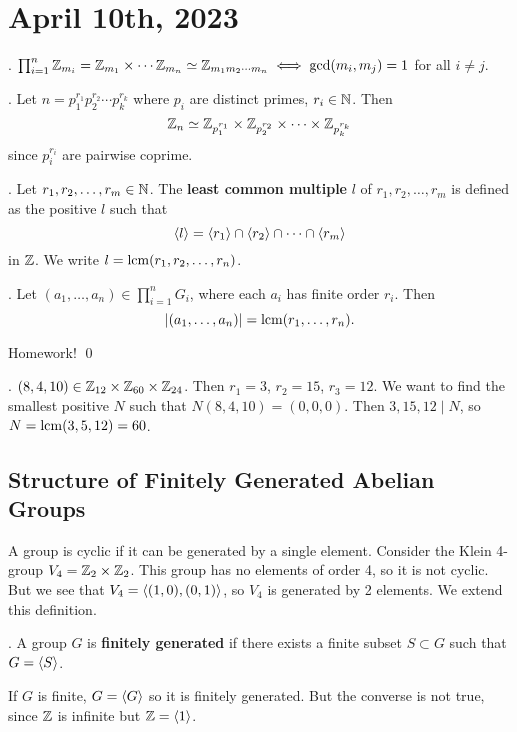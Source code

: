 \section*{April 10th, 2023}

\cor. \(\prod_{i=1}^n \mathbb{Z}_{m_i} = \mathbb{Z}_{m_1} \times \cdots \mathbb{Z}_{m_n} \simeq \mathbb{Z}_{m_1 m_2 \cdots m_n} \iff \gcd(m_i, m_j) = 1\) for all \(i \neq j\).

\ex. Let \(n = p_1^{r_1}p_2^{r_2} \cdots p_k^{r_k}\) where \(p_i\) are distinct primes, \(r_i \in \mathbb{N}\). Then
\[
    \mathbb{Z}_n \simeq \mathbb{Z}_{p_1^{r_1}} \times \mathbb{Z}_{p_2^{r_2}} \times \cdots \times \mathbb{Z}_{p_k^{r_k}}
\]
since \(p_i^{r_i}\) are pairwise coprime.

.  Let \(r_1, r_2, \dots, r_m \in \mathbb{N}\). The \textbf{least common multiple} \(l\) of \(r_1, r_2, \dots, r_m\) is defined as the positive \(l\) such that
\[
    \left\langle l \right\rangle = \left\langle r_1 \right\rangle \cap \left\langle r_2 \right\rangle \cap \cdots \cap \left\langle r_m \right\rangle
\]
in \(\mathbb{Z}\). We write \(l = {\rm lcm}(r_1, r_2, \dots, r_n)\).

\thm. Let \((a_1, \dots, a_n) \in \prod_{i=1}^n G_i\), where each \(a_i\) has finite order \(r_i\). Then
\[
    \left| (a_1, \dots, a_n) \right| = {\rm lcm}(r_1, \dots, r_n).
\]

\pf Homework! \qed

\ex. \((8, 4, 10) \in \mathbb{Z}_{12} \times \mathbb{Z}_{60} \times \mathbb{Z}_{24}\). Then \(r_1 = 3\), \(r_2 = 15\), \(r_3 = 12\). We want to find the smallest positive \(N\) such that \(N (8, 4, 10) = (0, 0, 0)\). Then \(3, 15, 12 \mid N\), so \(N = {\rm lcm}(3, 5, 12) = 60\).

\pagebreak

\subsection*{Structure of Finitely Generated Abelian Groups}

A group is cyclic if it can be generated by a single element. Consider the Klein 4-group \(V_4 = \mathbb{Z}_2 \times \mathbb{Z}_2\). This group has no elements of order 4, so it is not cyclic. But we see that \(V_4 = \left\langle (1, 0), (0, 1) \right\rangle\), so \(V_4\) is generated by 2 elements. We extend this definition.

.  A group \(G\) is \textbf{finitely generated} if there exists a finite subset \(S \subset G\) such that \(G = \left\langle S \right\rangle\).

\rmk If \(G\) is finite, \(G = \left\langle G \right\rangle\) so it is finitely generated. But the converse is not true, since \(\mathbb{Z}\) is infinite but \(\mathbb{Z} = \left\langle 1 \right\rangle\).

